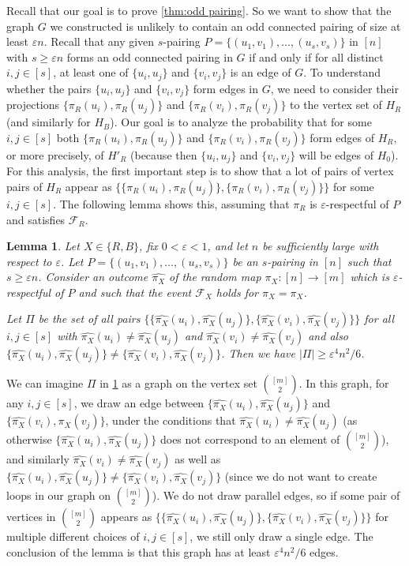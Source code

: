 \documentclass[11pt,reqno,oneside]{amsart}
\newtheorem{lemma}[theorem]{Lemma}
\theoremstyle{definition}
\newcommand\wh[1]{\widehat{#1}}
\newcommand\1{\mathbf{1}}
\newcommand{\eps}{\varepsilon}
\let\geq\geqslant
\begin{document}
Recall that our goal is to prove \cref{thm:odd pairing}. So we want to show that the graph $G$ we constructed is unlikely to contain an odd connected pairing of size at least $\eps n$. Recall that any given $s$-pairing $P=\{(u_1,v_1),\dots,(u_{s},v_{s})\}$ in $[n]$ with $s\geq \eps n$ forms an odd connected pairing in $G$ if and only if for all distinct $i,j\in [s]$, at least one of $\{u_i,u_j\}$ and $\{v_i,v_j\}$ is an edge of $G$. To understand whether the pairs $\{u_i,u_j\}$ and $\{v_i,v_j\}$ form edges in $G$, we need to consider their projections $\{\pi_R(u_i),\pi_R(u_j)\}$ and $\{\pi_R(v_i),\pi_R(v_j)\}$ to the vertex set of $H_R$ (and similarly for $H_B$). Our goal is to analyze the probability that for some $i,j\in [s]$ both $\{\pi_R(u_i),\pi_R(u_j)\}$ and $\{\pi_R(v_i),\pi_R(v_j)\}$ form edges of $H_R$, or more precisely, of $H'_R$ (because then $\{u_i,u_j\}$ and $\{v_i,v_j\}$ will be edges of $H_0$). For this analysis, the first important step is to show that a lot of pairs of vertex pairs of $H_R$ appear as $\big\{\{\pi_R(u_i),\pi_R(u_j)\}, \{\pi_R(v_i),\pi_R(v_j)\}\big\}$ for some $i,j\in [s]$. The following lemma shows this, assuming that $\pi_R$ is $\varepsilon$-respectful of $P$ and satisfies $\mathcal F_R$.

\begin{lemma}\label{lem:respectful yields many edges}
	Let $X\in \{R,B\}$, fix $0<\varepsilon<1$, and let $n$ be sufficiently large with respect to $\eps$. Let $P=\{(u_1,v_1),\dots,(u_{s},v_{s})\}$ be an $s$-pairing in $[n]$ such that $s\geq \eps n$. Consider an outcome $\wh{\pi_X}$ of the random map $\pi_X:[n] \to [m]$ which is $\varepsilon$-respectful of $P$ and such that the event $\mathcal F_X$ holds for $\pi_X=\wh{\pi_X}$.
    
    Let $\Pi$ be the set of all pairs $\big\{\{\wh{\pi_X}(u_i),\wh{\pi_X}(u_j)\}, \{\wh{\pi_X}(v_i),\wh{\pi_X}(v_j)\}\big\}$ for all $i,j\in [s]$ with $\wh{\pi_X}(u_i)\ne \wh{\pi_X}(u_j)$ and $\wh{\pi_X}(v_i)\ne \wh{\pi_X}(v_j)$ and also $\{\wh{\pi_X}(u_i),\wh{\pi_X}(u_j)\}\ne \{\wh{\pi_X}(v_i),\wh{\pi_X}(v_j)\}$. Then we have $|\Pi|\geq \eps^4n^2/6$.
\end{lemma}
We can imagine $\Pi$ in \cref{lem:respectful yields many edges} as a graph on the vertex set $\binom{[m]}{2}$. In this graph, for any $i,j\in [s]$, we draw an edge between $\{\wh{\pi_X}(u_i),\wh{\pi_X}(u_j)\}$ and $\{\wh{\pi_X}(v_i),\wh{\pi_X}(v_j)\}$, under the conditions that $\wh{\pi_X}(u_i)\ne \wh{\pi_X}(u_j)$ (as otherwise $\{\wh{\pi_X}(u_i),\wh{\pi_X}(u_j)\}$ does not correspond to an element of $\binom{[m]}{2}$), and similarly $\wh{\pi_X}(v_i)\ne \wh{\pi_X}(v_j)$ as well as $\{\wh{\pi_X}(u_i),\wh{\pi_X}(u_j)\}\ne \{\wh{\pi_X}(v_i),\wh{\pi_X}(v_j)\}$ (since we do not want to create loops in our graph on $\binom{[m]}{2}$). We do not draw parallel edges, so if some pair of vertices in $\binom{[m]}{2}$ appears as $\big\{\{\wh{\pi_X}(u_i),\wh{\pi_X}(u_j)\}, \{\wh{\pi_X}(v_i),\wh{\pi_X}(v_j)\}\big\}$ for multiple different choices of $i,j\in [s]$, we still only draw a single edge. The conclusion of the lemma is that this graph has at least $\eps^4n^2/6$ edges.
\end{document}
